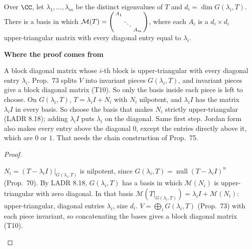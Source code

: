 \documentclass[10pt]{scrartcl}
\DeclareMathOperator{\nul}{null}
\newcommand{\MM}{\mathcal M}
\newenvironment{motive}{\begin{mdframed}[style=thinkbox]\textbf{\color{OliveGreen!75!black}Where the proof comes from}\begin{description}[leftmargin=0.9em,labelindent=0pt,itemsep=2pt,topsep=2pt,font=\normalfont\bfseries\color{OliveGreen!70!black}]}{\end{description}\end{mdframed}}
\newenvironment{steps}{\begin{enumerate}[label=\arabic*.,leftmargin=1.5em,itemsep=2pt,topsep=2pt]}{\end{enumerate}}
\begin{document}
\begin{theorem*}
  Over $\CC$, let $\lambda_1,\dots,\lambda_m$ be the distinct eigenvalues of $T$ and $d_i=\dim G(\lambda_i,T)$. There is a basis in which $\MM(T)=\begin{psmallmatrix}A_1&&\\&\ddots&\\&&A_m\end{psmallmatrix}$, where each $A_i$ is a $d_i\times d_i$ upper-triangular matrix with every diagonal entry equal to $\lambda_i$.
\end{theorem*}
\begin{motive}
  \ii[Want.] A block diagonal matrix whose $i$-th block is upper-triangular with every diagonal entry $\lambda_i$.
  \ii[Know.] Prop.~73 splits $V$ into invariant pieces $G(\lambda_i,T)$, and invariant pieces give a block diagonal matrix (T10). So only the basis inside each piece is left to choose.
   On $G(\lambda_i,T)$, $T=\lambda_iI+N_i$ with $N_i$ nilpotent, and $\lambda_iI$ has the matrix $\lambda_iI$ in every basis. So choose the basis that makes $N_i$ strictly upper-triangular (LADR 8.18); adding $\lambda_iI$ puts $\lambda_i$ on the diagonal.
   Same first step. Jordan form also makes every entry above the diagonal $0$, except the entries directly above it, which are $0$ or $1$. That needs the chain construction of Prop.~75.
\end{motive}
\begin{proof}
  \begin{steps}
    \ii $N_i=(T-\lambda_iI)|_{G(\lambda_i,T)}$ is nilpotent, since $G(\lambda_i,T)=\nul(T-\lambda_iI)^n$ (Prop.~70). By LADR 8.18, $G(\lambda_i,T)$ has a basis in which $\MM(N_i)$ is upper-triangular with zero diagonal.
    \ii In that basis $\MM(T|_{G(\lambda_i,T)})=\lambda_iI+\MM(N_i)$: upper-triangular, diagonal entries $\lambda_i$, size $d_i$.
    \ii $V=\bigoplus_iG(\lambda_i,T)$ (Prop.~73) with each piece invariant, so concatenating the bases gives a block diagonal matrix (T10).
  \end{steps}
\end{proof}
\end{document}
